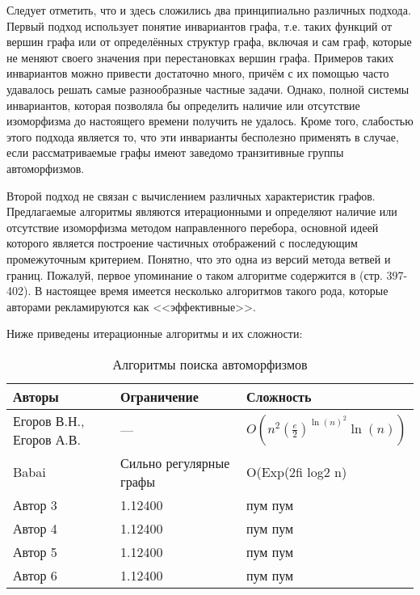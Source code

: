 Следует отметить, что и здесь сложились два принципиально различных подхода. Первый подход использует понятие инвариантов графа, т.е. таких функций от вершин графа или от определённых структур графа, включая и сам граф, которые не меняют своего значения при перестановках вершин графа. Примеров таких инвариантов можно привести достаточно много, причём с их помощью часто удавалось решать самые разнообразные частные задачи. Однако, полной системы инвариантов, которая позволяла бы определить наличие или отсутствие изоморфизма до настоящего времени получить не удалось. Кроме того, слабостью этого подхода является то, что эти инварианты бесполезно применять в случае, если рассматриваемые графы имеют заведомо транзитивные группы автоморфизмов.

Второй подход не связан с вычислением различных характеристик графов. Предлагаемые алгоритмы являются итерационными и определяют наличие или отсутствие изоморфизма методом направленного перебора, основной идеей которого является построение частичных отображений с последующим промежуточным критерием. Понятно, что это одна из версий метода ветвей и границ. Пожалуй, первое упоминание о таком алгоритме содержится в \cite{Book_Reingold} (стр. 397-402). В настоящее время имеется несколько алгоритмов такого рода, которые авторами рекламируются как <<эффективные>>.

Ниже приведены итерационные алгоритмы и их сложности:

\begin{table}[h]
\centering
\begin{tabular}[t]{|l|l|l|}
\hline
\textbf{Авторы} & \textbf{Ограничение} & \textbf{Сложность}\\
\hline
Егоров В.Н., Егоров А.В. \cite{ArtMain_Egorov} & --- & $O(n^2(\frac{e}{2})^{\ln(n)^2} \ln(n))$\\
\hline
Babai \cite{ArtSrg_Babai}& Сильно регулярные графы & O(Exp(2fi log2 n)\\
\hline
Автор 3 & 1.12400 & пум пум\\
\hline
Автор 4 & 1.12400 & пум пум\\
\hline
Автор 5 & 1.12400 & пум пум\\
\hline
Автор 6 & 1.12400 & пум пум\\
\hline
\end{tabular}
\caption{Алгоритмы поиска автоморфизмов}
\label{tabular:algos}
\end{table}
